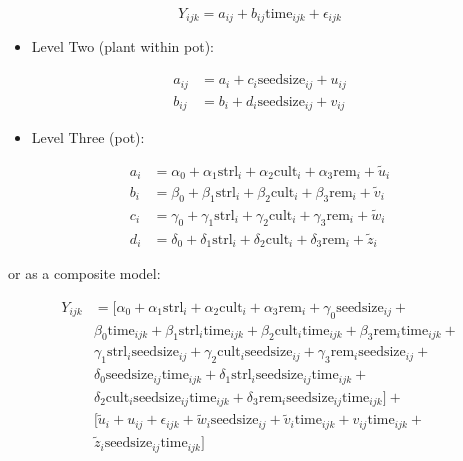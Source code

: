 \documentclass[
]{krantz}
\providecommand{\tightlist}{%
  \setlength{\itemsep}{0pt}\setlength{\parskip}{0pt}}
\begin{document}
\begin{equation*}
Y_{ijk} = a_{ij}+b_{ij}\textrm{time}_{ijk}+\epsilon_{ijk}
\end{equation*}

\begin{itemize}
\tightlist
\item
  Level Two (plant within pot):
\end{itemize}

\begin{align*}
a_{ij} & = a_{i}+c_{i}\textrm{seedsize}_{ij}+u_{ij} \\
b_{ij} & = b_{i}+d_{i}\textrm{seedsize}_{ij}+v_{ij}
\end{align*}

\begin{itemize}
\tightlist
\item
  Level Three (pot):
\end{itemize}

\begin{align*}
a_{i} & = \alpha_{0}+\alpha_{1}\textrm{strl}_{i}+\alpha_{2}\textrm{cult}_{i}+\alpha_{3}\textrm{rem}_{i}+ \tilde{u}_{i}\\
b_{i} & = \beta_{0}+\beta_{1}\textrm{strl}_{i}+\beta_{2}\textrm{cult}_{i}+\beta_{3}\textrm{rem}_{i}+ \tilde{v}_{i} \\
c_{i} & = \gamma_{0}+\gamma_{1}\textrm{strl}_{i}+\gamma_{2}\textrm{cult}_{i}+\gamma_{3}\textrm{rem}_{i}+ \tilde{w}_{i} \\
d_{i} & = \delta_{0}+\delta_{1}\textrm{strl}_{i}+\delta_{2}\textrm{cult}_{i}+\delta_{3}\textrm{rem}_{i}+ \tilde{z}_{i}
\end{align*}

or as a composite model:

\begin{align*}
Y_{ijk} & = [\alpha_{0}+\alpha_{1}\textrm{strl}_{i}+\alpha_{2}\textrm{cult}_{i}+\alpha_{3}\textrm{rem}_{i} +
 \gamma_{0}\textrm{seedsize}_{ij} + \\
 & \beta_{0}\textrm{time}_{ijk} + \beta_{1}\textrm{strl}_{i}\textrm{time}_{ijk}+\beta_{2}\textrm{cult}_{i}\textrm{time}_{ijk}+ \beta_{3}\textrm{rem}_{i}\textrm{time}_{ijk} + \\
 & \gamma_{1}\textrm{strl}_{i}\textrm{seedsize}_{ij}+\gamma_{2}\textrm{cult}_{i}\textrm{seedsize}_{ij}+ \gamma_{3}\textrm{rem}_{i}\textrm{seedsize}_{ij} + \\
 & \delta_{0}\textrm{seedsize}_{ij}\textrm{time}_{ijk} + \delta_{1}\textrm{strl}_{i}\textrm{seedsize}_{ij}\textrm{time}_{ijk} + \\
 & \delta_{2}\textrm{cult}_{i}\textrm{seedsize}_{ij}\textrm{time}_{ijk} + \delta_{3}\textrm{rem}_{i}\textrm{seedsize}_{ij}\textrm{time}_{ijk}] + \\
 & [\tilde{u}_{i} + u_{ij} + \epsilon_{ijk} + \tilde{w}_{i}\textrm{seedsize}_{ij} + \tilde{v}_{i}\textrm{time}_{ijk} + v_{ij}\textrm{time}_{ijk} + \\ 
 & \tilde{z}_{i}\textrm{seedsize}_{ij}\textrm{time}_{ijk} ]
\end{align*}
\end{document}
